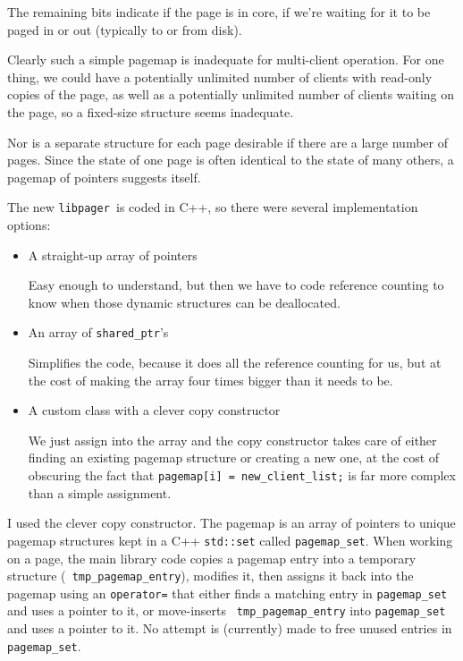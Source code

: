 \documentclass{article}
\def\libpager{{\tt libpager\ }}
\begin{document}
The remaining bits indicate if the page is in core, if we're waiting
for it to be paged in or out (typically to or from disk).

Clearly such a simple pagemap is inadequate for multi-client
operation.  For one thing, we could have a potentially unlimited
number of clients with read-only copies of the page, as well as a
potentially unlimited number of clients waiting on the page, so
a fixed-size structure seems inadequate.

Nor is a separate structure for each page desirable if there are
a large number of pages.  Since the state of one page is often
identical to the state of many others, a pagemap of pointers
suggests itself.

The new \libpager is coded in C++, so there were several implementation options:

\begin{itemize}

\item  A straight-up array of pointers

Easy enough to understand, but then we have to
code reference counting to know when those dynamic structures can be
deallocated.

\item An array of {\tt shared_ptr}'s

Simplifies the code, because
it does all the reference counting for us, but at the cost of making
the array four times bigger than it needs to be.

\item A custom class with a clever copy constructor

We just assign into the array and the copy constructor takes care of
either finding an existing pagemap structure or creating a new one, at
the cost of obscuring the fact that {\tt pagemap[i] = new_client_list;} is
far more complex than a simple assignment.

\end{itemize}

I used the clever copy constructor.  The pagemap is an array of
pointers to unique pagemap structures kept in a C++ {\tt std::set}
called {\tt pagemap_set}.  When working on a page, the main library
code copies a pagemap entry into a temporary structure ({\tt
  tmp_pagemap_entry}), modifies it, then assigns it back into the
pagemap using an {\tt operator=} that either finds a matching entry in
{\tt pagemap_set} and uses a pointer to it, or move-inserts {\tt
  tmp_pagemap_entry} into {\tt pagemap_set} and uses a pointer to it.
No attempt is (currently) made to free unused entries in {\tt
  pagemap_set}.
\end{document}
